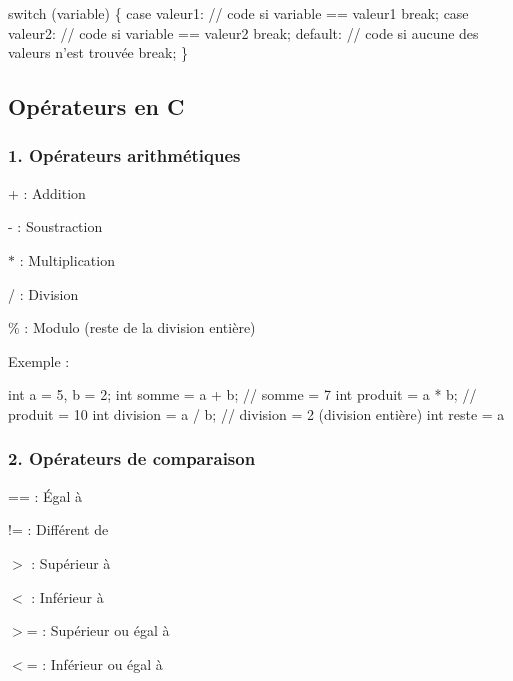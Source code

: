 \begin{DoxyCode}
\textcolor{keywordflow}{switch} (variable) \{
    \textcolor{keywordflow}{case} valeur1:
        \textcolor{comment}{// code si variable == valeur1}
        \textcolor{keywordflow}{break};
    \textcolor{keywordflow}{case} valeur2:
        \textcolor{comment}{// code si variable == valeur2}
        \textcolor{keywordflow}{break};
    \textcolor{keywordflow}{default}:
        \textcolor{comment}{// code si aucune des valeurs n'est trouvée}
        \textcolor{keywordflow}{break};
\}
\end{DoxyCode}


\subsection*{Opérateurs en C}

\subsubsection*{1. Opérateurs arithmétiques}


\begin{DoxyItemize}
\item {\ttfamily +} \+: Addition
\item {\ttfamily -\/} \+: Soustraction
\item {\ttfamily $\ast$} \+: Multiplication
\item {\ttfamily /} \+: Division
\item {\ttfamily \%} \+: Modulo (reste de la division entière)
\end{DoxyItemize}

Exemple \+: 
\begin{DoxyCode}
\textcolor{keywordtype}{int} a = 5, b = 2;
\textcolor{keywordtype}{int} somme = a + b;     \textcolor{comment}{// somme = 7}
\textcolor{keywordtype}{int} produit = a * b;   \textcolor{comment}{// produit = 10}
\textcolor{keywordtype}{int} division = a / b;  \textcolor{comment}{// division = 2 (division entière)}
\textcolor{keywordtype}{int} reste = a %
\end{DoxyCode}


\subsubsection*{2. Opérateurs de comparaison}


\begin{DoxyItemize}
\item {\ttfamily ==} \+: Égal à
\item {\ttfamily !=} \+: Différent de
\item {\ttfamily $>$} \+: Supérieur à
\item {\ttfamily $<$} \+: Inférieur à
\item {\ttfamily $>$=} \+: Supérieur ou égal à
\item {\ttfamily $<$=} \+: Inférieur ou égal à
\end{DoxyItemize}

